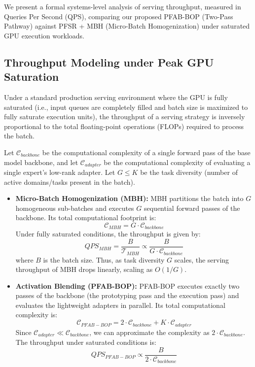 \documentclass{article}
\theoremstyle{plain}
\theoremstyle{definition}
\theoremstyle{remark}
\begin{document}
We present a formal systems-level analysis of serving throughput, measured in Queries Per Second (QPS), comparing our proposed \textsc{PFAB-BOP} (Two-Pass Pathway) against \textsc{PFSR} + \textsc{MBH} (Micro-Batch Homogenization) under saturated GPU execution workloads.

\subsection{Throughput Modeling under Peak GPU Saturation}
Under a standard production serving environment where the GPU is fully saturated (i.e., input queues are completely filled and batch size is maximized to fully saturate execution units), the throughput of a serving strategy is inversely proportional to the total floating-point operations (FLOPs) required to process the batch. 

Let $\mathcal{C}_{backbone}$ be the computational complexity of a single forward pass of the base model backbone, and let $\mathcal{C}_{adapter}$ be the computational complexity of evaluating a single expert's low-rank adapter. Let $G \le K$ be the task diversity (number of active domains/tasks present in the batch).
\begin{itemize}
  \item \textbf{Micro-Batch Homogenization (MBH):} MBH partitions the batch into $G$ homogeneous sub-batches and executes $G$ sequential forward passes of the backbone. Its total computational footprint is:
  \begin{equation}
    \mathcal{C}_{MBH} = G \cdot \mathcal{C}_{backbone}
  \end{equation}
  Under fully saturated conditions, the throughput is given by:
  \begin{equation}
    QPS_{MBH} = \frac{B}{\mathcal{T}_{MBH}} \propto \frac{B}{G \cdot \mathcal{C}_{backbone}}
  \end{equation}
  where $B$ is the batch size. Thus, as task diversity $G$ scales, the serving throughput of MBH drops linearly, scaling as $O(1/G)$.
  
  \item \textbf{Activation Blending (PFAB-BOP):} PFAB-BOP executes exactly two passes of the backbone (the prototyping pass and the execution pass) and evaluates the lightweight adapters in parallel. Its total computational complexity is:
  \begin{equation}
    \mathcal{C}_{PFAB-BOP} = 2 \cdot \mathcal{C}_{backbone} + K \cdot \mathcal{C}_{adapter}
  \end{equation}
  Since $\mathcal{C}_{adapter} \ll \mathcal{C}_{backbone}$, we can approximate the complexity as $2 \cdot \mathcal{C}_{backbone}$. The throughput under saturated conditions is:
  \begin{equation}
    QPS_{PFAB-BOP} \propto \frac{B}{2 \cdot \mathcal{C}_{backbone}}
  \end{equation}
\end{itemize}
\end{document}
